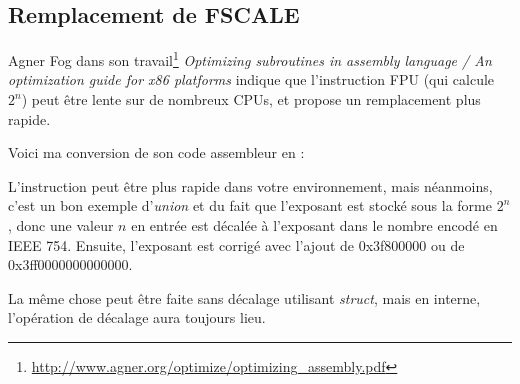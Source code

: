\subsection{Remplacement de FSCALE}

Agner Fog dans son travail\footnote{\url{http://www.agner.org/optimize/optimizing_assembly.pdf}}
\emph{Optimizing subroutines in assembly language / An optimization guide for x86 platforms}
indique que l'instruction \ac{FPU}  (qui calcule $2^n$) peut être lente
sur de nombreux CPUs, et propose un remplacement plus rapide.

Voici ma conversion de son code assembleur en \CCpp:



L'instruction  peut être plus rapide dans votre environnement, mais néanmoins,
c'est un bon exemple d'\emph{union} et du fait que l'exposant est stocké sous la forme
$2^n$, donc une valeur $n$ en entrée est décalée à l'exposant dans le nombre encodé
en IEEE 754.
Ensuite, l'exposant est corrigé avec l'ajout de 0x3f800000 ou de 0x3ff0000000000000.

La même chose peut être faite sans décalage utilisant \emph{struct}, mais en interne,
l'opération de décalage aura toujours lieu.

